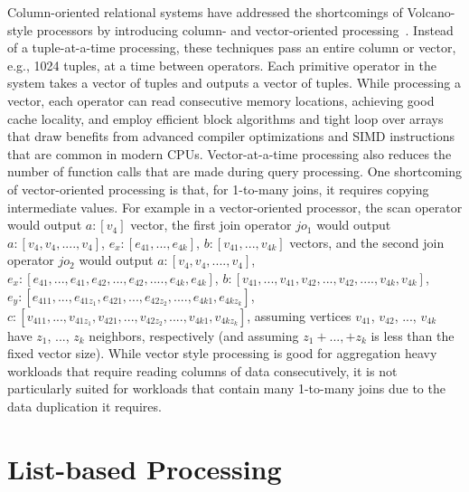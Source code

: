 Column-oriented relational systems have addressed the shortcomings of Volcano-style processors by introducing column- and vector-oriented processing~\cite{boncz-phd, monet-2decades}. Instead of a tuple-at-a-time processing, these techniques pass an entire column or vector, e.g., 1024 tuples, at a time between operators. Each primitive operator in the system takes a vector of tuples and outputs a vector of tuples. 
While processing a vector, each operator can read consecutive memory locations, achieving good cache locality, and employ efficient block algorithms and tight loop over arrays that draw benefits from advanced compiler optimizations and SIMD instructions that are common in modern CPUs. Vector-at-a-time processing also reduces the number of function calls that are made during query processing. One shortcoming of vector-oriented processing is that, for 1-to-many joins, it requires copying intermediate values. For example in a vector-oriented processor, the scan operator would output $a:[v_4]$ vector, the first join operator $jo_1$ would output $a:[v_4, v_4, ...., v_4]$, $e_x:[e_{41}, ..., e_{4k}]$, $b:[v_{41}, ..., v_{4k}]$ vectors, and the second join operator $jo_2$ would output  $a:[v_4, v_4, ...., v_4]$, $e_x:[e_{41},...,e_{41}, e_{42}, ..., e_{42}, ...., e_{4k}, e_{4k}]$, $b:[v_{41},...,v_{41}, v_{42}, ..., v_{42}, ...., v_{4k}, v_{4k}]$, $e_y:[e_{411},...,e_{41z_1}, e_{421}, ..., e_{42z_2}, ...., e_{4k1}, e_{4kz_k}]$, $c:[v_{411},...,v_{41z_1}, v_{421}, ..., v_{42z_2}, ...., v_{4k1}, v_{4kz_k}]$, assuming vertices $v_{41}$, $v_{42}$, ..., $v_{4k}$ have $z_1$, ..., $z_k$ neighbors, respectively (and assuming $z_1 +  ..., + z_k$ is less than the fixed vector size). While vector style processing is good for aggregation heavy workloads that require reading columns of data consecutively, it is not particularly suited for workloads that contain many 1-to-many joins due to the data duplication it requires.


\section{List-based Processing}
\label{sec:list-based-proc}

